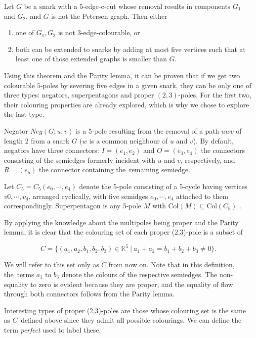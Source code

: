 \begin{theorem}
	Let $G$ be a snark with a $5$-edge-c-cut whose removal results in components $G_1$ and $G_2$, and $G$ is not the Petersen graph. Then either
	\begin{enumerate}[nolistsep]
		\item one of $G_1,G_2$ is not 3-edge-colourable, or
		\item both can be extended to snarks by adding at most five vertices such that at least one of those extended graphs is smaller than $G$.
	\end{enumerate}
\end{theorem}

Using this theorem and the Parity lemma, it can be proven that if we get two colourable $5$-poles by severing five edges in a given snark, they can be only one of three types: negators, superpentagons and proper $(2,3)$-poles. For the first two, their colouring properties are already explored, which is why we chose to explore the last type.

Negator $Neg(G;u,v)$ is a 5-pole resulting from the removal of a path $uwv$ of length 2 from a snark $G$ ($w$ is a common neighbour of $u$ and $v$). By default, negators have three connectors: $I = (e_1,e_2)$ and $O = (e_3,e_4)$ the connectors consisting of the semiedges formerly incident with $u$ and $v$, respectively, and $R = (e_5)$ the connector containing the~remaining semiedge.

Let $C_5 = C_5(e_0, \cdots , e_4)$ denote the 5-pole consisting of a 5-cycle having vertices $v0, \cdots , v_4$, arranged cyclically, with five semidges $e_0,\cdots,e_4$ attached to them correspondingly. Superpentagon is any 5-pole $M$ with $\text{Col}(M)\subseteq \text{Col}(C_5)$ \cite{MorphologyOfSmall}.

By applying the knowledge about the multipoles being proper and the Parity lemma, it is clear that the colouring set of each proper (2,3)-pole is a subset of

$$C=\{(a_1,a_2,b_1,b_2,b_3)\in\mathbb{K}^5~|~a_1+a_2=b_1+b_2+b_3\neq 0\}.$$

We will refer to this set only as $C$ from now on. Note that in this definition, the~terms $a_1$ to $b_3$ denote the colours of the respective semiedges. The non-equality to zero is evident because they are proper, and the equality of flow through both connectors follows from the Parity lemma.

Interesting types of proper (2,3)-poles are those whose colouring set is the same as $C$~defined above since they admit all possible colourings. We can define the term \textit{perfect} used to label these.

